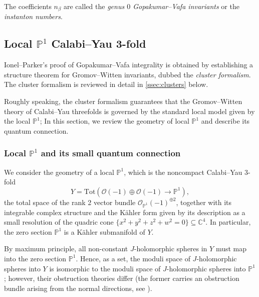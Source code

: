 \documentclass[reqno]{amsart}
\numberwithin{equation}{section}
\numberwithin{equation}{section}
\numberwithin{equation}{section}
\theoremstyle{definition}
\theoremstyle{remark}
\theoremstyle{remark}
\begin{document}
The coefficients $n_\beta$ are called the \emph{genus $0$ Gopakumar--Vafa invariants} or the \emph{instanton numbers}.


\subsection{Local $\mathbb{P}^1$ Calabi--Yau 3-fold}\label{ssec:local-p1-geometry}

Ionel--Parker's proof of Gopakumar--Vafa integrality is obtained by establishing a structure theorem for Gromov--Witten invariants, dubbed the \emph{cluster formalism}. The cluster formalism is reviewed in detail in \cref{ssec:clusters} below. 

Roughly speaking, the cluster formalism guarantees that the Gromov--Witten theory of Calabi--Yau threefolds is governed by the standard local model given by the local $\mathbb{P}^1$; In this section, we review the geometry of local $\mathbb{P}^1$ and describe its quantum connection.


\subsubsection{Local $\mathbb{P}^1$ and its small quantum connection}
We consider the geometry of a local $\mathbb{P}^1$, which is the noncompact Calabi--Yau $3$-fold
\begin{equation}
    Y = \mathrm{Tot} \left( \mathcal{O}(-1) \oplus \mathcal{O}(-1) \to \mathbb{P}^1 \right),
\end{equation}
the total space of the rank 2 vector bundle $\mathcal{O}_{\mathbb{P}^1}(-1)^{\oplus 2}$, together with its integrable complex structure and the K\"ahler form given by its description as a small resolution of the quadric cone $\{x^2+y^2+z^2+w^2 = 0\} \subseteq \mathbb{C}^4$.  In particular, the zero section $\mathbb{P}^1$ is a K\"ahler submanifold of $Y$. 

By maximum principle, all non-constant $J$-holomorphic spheres in $Y$ must map into the zero section $\mathbb{P}^1$. Hence, as a set, the moduli space of $J$-holomorphic spheres into $Y$ is isomorphic to the moduli space of $J$-holomorphic spheres into $\mathbb{P}^1$; however, their obstruction theories differ (the former carries an obstruction bundle arising from the normal directions, see \cite{Voi96, Lee23a}).
\end{document}
